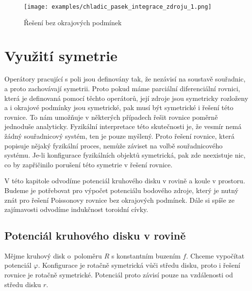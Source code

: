 \documentclass{book}
\begin{document}
\begin{figure}
	\texttt{[image: examples/chladic\_pasek\_integrace\_zdroju\_1.png]}
	\caption{Řešení bez okrajových podmínek}
	\label{img:pasek_integrace_zdroju_1}
\end{figure}





\chapter{Využití symetrie}

Operátory pracující s poli jsou definovány tak, že nezávisí na soustavě souřadnic, a proto zachovávají symetrii. Proto pokud máme parciální diferenciální rovnici, která je definovaná pomocí
těchto operátorů, její zdroje jsou symetricky rozloženy a i okrajové podmínky jsou symetrické, pak musí být symetrické i řešení této rovnice. To nám umožňuje v některých případech
řešit rovnice poměrně jednoduše analyticky. Fyzikální interpretace této skutečnosti je, že vesmír nemá žádný souřadnicový systém, ten je pouze myšlený. Proto řešení rovnice, která popisuje
nějaký fyzikální proces, nemůže záviset na volbě souřadnicového systému. Je-li konfigurace fyzikálních objektů symetrická, pak zde neexistuje nic, co by zapřičinilo porušení této symetrie
v řešení rovnice.

V této kapitole odvodíme potenciál kruhového disku v rovině a koule v prostoru. Budeme je potřebovat pro výpočet potenciálu bodového zdroje, který je nutný znát pro řešení Poissonovy rovnice
bez okrajových podmínek. Dále si spíše ze zajímavosti odvodíme indukčnost toroidní cívky.

\section{Potenciál kruhového disku v rovině}

Mějme kruhový disk o~poloměru \(R\) s konstantním buzením \(f\). Chceme vypočítat potenciál \(\varphi\). Konfigurace je rotačně symetrická vůči středu
disku, proto i řešení rovnice je rotačně symetrické. Potenciál proto závisí pouze na vzdálenosti od středu disku \(r\).


\end{document}
